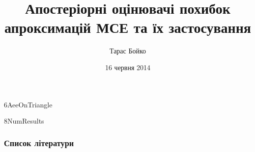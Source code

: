 \documentclass[12pt]{beamer}
\title[Апостеріорні оцінювачі похибок МСЕ]{Апостеріорні оцінювачі похибок апроксимацій МСЕ та їх застосування}
\author{Тарас Бойко}
\date{16 червня 2014}
\begin{document}
	

	
	
	
	
	
	{6AeeOnTriangle}
	
	{8NumResults}



	\begin{frame}[allowframebreaks]
		\frametitle<presentation>{Список літератури}
		\nocite{*}
		\printbibliography
	\end{frame}
\end{document}
